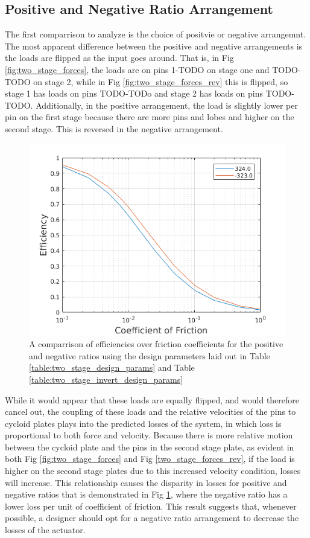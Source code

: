 \subsection{Positive and Negative Ratio Arrangement}\label{ch:dual:discussion:pos_neg}

The first comparrison to analyze is the choice of positvie or negative arrangemnt. The most apparent difference between the positive and negative arrangements is the loads are flipped as the input goes around. That is, in Fig \ref{fig:two_stage_forces}, the loads are on pins 1-TODO on stage one and TODO-TODO on stage 2, while in Fig \ref{fig:two_stage_forces_rev} this is flipped, so stage 1 has loads on pins TODO-TODo and stage 2 has loads on pins TODO-TODO. Additionally, in the positive arrangement, the load is slightly lower per pin on the first stage because there are more pins and lobes and higher on the second stage. This is reversed in the negative arrangement. 

\begin{figure}[h]
	\centering
	\includegraphics[width=0.75\linewidth]{fig/two_stage_pos_neg}
   \caption{A comparrison of efficiencies over friction coefficients for the positive and negative ratios using the design parameters laid out in Table \ref{table:two_stage_design_params} and Table \ref{table:two_stage_invert_design_params}}
   \label{fig:two_stage_pos_neg}
\end{figure}

While it would appear that these loads are equally flipped, and would therefore cancel out, the coupling of these loads and the relative velocities of the pins to cycloid plates plays into the predicted losses of the system, in which loss is proportional to both force and velocity. Because there is more relative motion between the cycloid plate and the pins in the second stage plate, as evident in both Fig \ref{fig:two_stage_forces} and Fig \ref{two_stage_forces_rev}, if the load is higher on the second stage plates due to this increased velocity condition, losses will increase. This relationship causes the disparity in losses for positive and negative ratios that is demonstrated in Fig \ref{fig:two_stage_pos_neg}, where the negative ratio has a lower loss per  unit of coefficient of friction. This result suggests that, whenever possible, a designer should opt for a negative ratio arrangement to decrease the losses of the actuator. 



